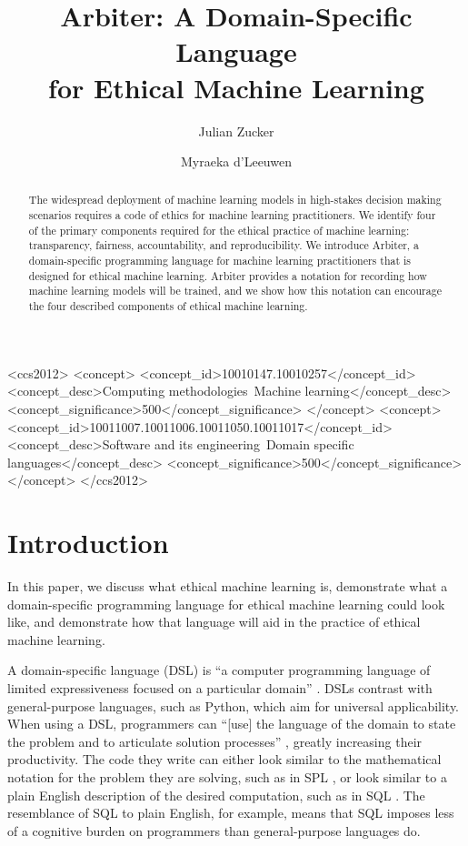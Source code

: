 \documentclass[sigconf]{acmart}
\title{Arbiter: A Domain-Specific Language \\for Ethical Machine Learning}
\author{Julian Zucker}
\affiliation{%
    \institution{Northeastern University}
}
\author{Myraeka d'Leeuwen}
\affiliation{%
    \institution{Northeastern University}
}
\begin{document}
\begin{abstract}
The widespread deployment of machine learning models in high-stakes decision making scenarios requires a code of ethics for machine learning practitioners. We identify four of the primary components required for the ethical practice of machine learning: transparency, fairness, accountability, and reproducibility. We introduce Arbiter, a domain-specific programming language for machine learning practitioners that is designed for ethical machine learning. Arbiter provides a notation for recording how machine learning models will be trained, and we show how this notation can encourage the four described components of ethical machine learning.
\end{abstract}

\begin{CCSXML}
<ccs2012>
<concept>
<concept_id>10010147.10010257</concept_id>
<concept_desc>Computing methodologies~Machine learning</concept_desc>
<concept_significance>500</concept_significance>
</concept>
<concept>
<concept_id>10011007.10011006.10011050.10011017</concept_id>
<concept_desc>Software and its engineering~Domain specific languages</concept_desc>
<concept_significance>500</concept_significance>
</concept>
</ccs2012>
\end{CCSXML}




\maketitle

\section{Introduction}
In this paper, we discuss what ethical machine learning is, demonstrate what a domain-specific programming language for ethical machine learning could look like, and demonstrate how that language will aid in the practice of ethical machine learning.

A domain-specific language (DSL) is ``a computer programming language of limited expressiveness focused on a particular domain'' \citep{Fowler2010}. DSLs contrast with general-purpose languages, such as Python, which aim for universal applicability. When using a DSL, programmers can ``[use] the language of the domain to state the problem and to articulate solution processes'' \citep{Felleisen2015}, greatly increasing their productivity. The code they write can either look similar to the mathematical notation for the problem they are solving, such as in SPL \citep{Werk2012}, or look similar to a plain English description of the desired computation, such as in SQL \citep{Date1997}. The resemblance of SQL to plain English, for example, means that SQL imposes less of a cognitive burden on programmers than general-purpose languages do.
\end{document}
